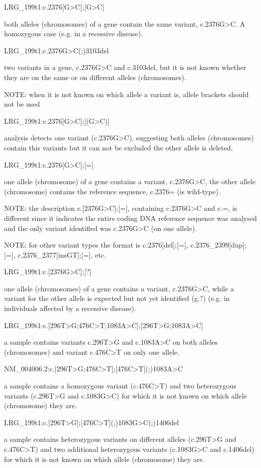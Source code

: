 \documentclass{book}
\begin{document}
	LRG\_199t1:c.2376[G>C];[G>C]

	both alleles (chromosomes) of a gene contain the same variant, c.2376G>C. A homozygous case (e.g. in a recessive disease).

	LRG\_199t1:c.2376G>C(;)3103del

	two variants in a gene, c.2376G>C and c.3103del, but it is not known whether they are on the same or on different alleles (chromosomes).

	NOTE: when it is not known on which allele a variant is, allele brackets should not be used

	LRG\_199t1:c.2376[G>C];[(G>C)]

	analysis detects one variant (c.2376G>C), suggesting both alleles (chromosomes) contain this variants but it can not be excluded the other allele is deleted.

	LRG\_199t1:c.2376[G>C];[=]

	one allele (chromosome) of a gene contains a variant, c.2376G>C, the other allele (chromosome) contains the reference sequence, c.2376= (is wild-type).

	NOTE: the description c.[2376G>C];[=], containing c.2376G>C and c.=, is different since it indicates the entire coding DNA reference sequence was analysed and the only variant identified was c.2376G>C (on one allele).

	NOTE: for other variant types the format is c.2376[del];[=], c.2376\_2399[dup];[=], c.2376\_2377[insGT];[=], etc.

	LRG\_199t1:c.[2376G>C];[?]

	one allele (chromosomes) of a gene contains a variant, c.2376G>C, while a variant for the other allele is expected but not yet identified (g.?) (e.g. in individuals affected by a recessive disease).

	LRG\_199t1:c.[296T>G;476C>T;1083A>C];[296T>G;1083A>C]

	a sample contains variants c.296T>G and c.1083A>C on both alleles (chromosomes) and variant c.476C>T on only one allele.

	NM\_004006.2:c.[296T>G;476C>T];[476C>T](;)1083A>C

	a sample contains a homozygous variant (c.476C>T) and two heterozygous variants (c.296T>G and c.1083G>C) for which it is not known on which allele (chromosome) they are.

	LRG\_199t1:c.[296T>G];[476C>T](;)1083G>C(;)1406del

	a sample contains heterozygous variants on different alleles (c.296T>G and c.476C>T) and two additional heterozygous variants (c.1083G>C and c.1406del) for which it is not known on which allele (chromosome) they are.
\end{document}
